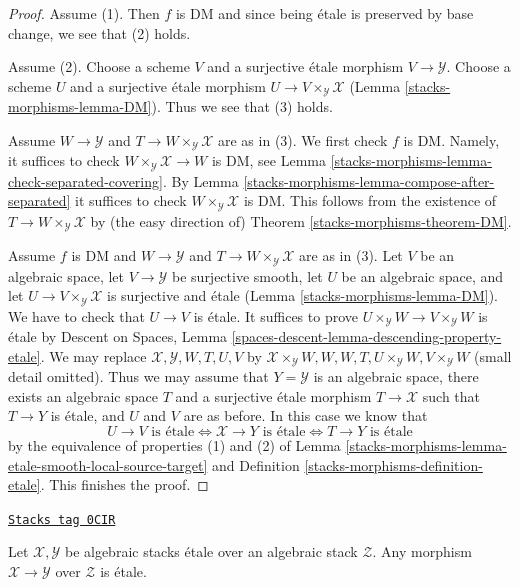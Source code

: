 \begin{proof}
Assume (1). Then $f$ is DM and since being \'etale is preserved
by base change, we see that (2) holds.

\medskip\noindent
Assume (2). Choose a scheme $V$ and a surjective \'etale morphism
$V \to \mathcal{Y}$. Choose a scheme $U$ and a surjective \'etale morphism
$U \to V \times_\mathcal{Y} \mathcal{X}$ (Lemma \ref{stacks-morphisms-lemma-DM}).
Thus we see that (3) holds.

\medskip\noindent
Assume $W \to \mathcal{Y}$ and $T \to W \times_\mathcal{Y} \mathcal{X}$
are as in (3). We first check $f$ is DM. Namely, it suffices to check
$W \times_\mathcal{Y} \mathcal{X} \to W$ is DM, see
Lemma \ref{stacks-morphisms-lemma-check-separated-covering}.
By Lemma \ref{stacks-morphisms-lemma-compose-after-separated}
it suffices to check $W \times_\mathcal{Y} \mathcal{X}$ is DM.
This follows from the existence of $T \to W \times_\mathcal{Y} \mathcal{X}$
by (the easy direction of) Theorem \ref{stacks-morphisms-theorem-DM}.

\medskip\noindent
Assume $f$ is DM and $W \to \mathcal{Y}$ and
$T \to W \times_\mathcal{Y} \mathcal{X}$ are as in (3).
Let $V$ be an algebraic space, let $V \to \mathcal{Y}$ be surjective smooth,
let $U$ be an algebraic space, and let
$U \to V \times_\mathcal{Y} \mathcal{X}$ is surjective and \'etale
(Lemma \ref{stacks-morphisms-lemma-DM}). We have to check that $U \to V$ is \'etale.
It suffices to prove $U \times_\mathcal{Y} W \to V \times_\mathcal{Y} W$
is \'etale by Descent on Spaces, Lemma
\ref{spaces-descent-lemma-descending-property-etale}.
We may replace $\mathcal{X}, \mathcal{Y}, W, T, U, V$ by
$\mathcal{X} \times_\mathcal{Y} W, W, W, T, U \times_\mathcal{Y} W,
V \times_\mathcal{Y} W$ (small detail omitted).
Thus we may assume that $Y = \mathcal{Y}$ is an algebraic space, there exists
an algebraic space $T$ and a surjective \'etale morphism
$T \to \mathcal{X}$ such that $T \to Y$ is \'etale, and $U$ and $V$
are as before. In this case we know that
$$
U \to V\text{ is \'etale}
\Leftrightarrow
\mathcal{X} \to Y\text{ is \'etale}
\Leftrightarrow
T \to Y\text{ is \'etale}
$$
by the equivalence of properties (1) and (2) of
Lemma \ref{stacks-morphisms-lemma-etale-smooth-local-source-target}
and Definition \ref{stacks-morphisms-definition-etale}.
This finishes the proof.
\end{proof}

\begin{lemma}
\label{stacks-morphisms-lemma-etale-permanence}
\href{https://stacks.math.columbia.edu/tag/0CIR}{\texttt{Stacks tag 0CIR}}

Let $\mathcal{X}, \mathcal{Y}$ be algebraic stacks \'etale over
an algebraic stack $\mathcal{Z}$. Any morphism
$\mathcal{X} \to \mathcal{Y}$ over $\mathcal{Z}$ is \'etale.
\end{lemma}

